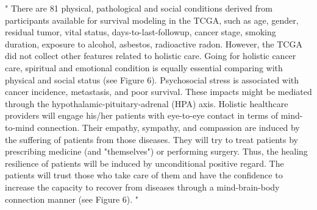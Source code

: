 \documentclass[preprint,12pt]{elsarticle}
\newenvironment{MyIndent}
{\par\leftskip1cm\relax\rightskip1cm\relax}
{\par\leftskip0cm\relax\rightskip0cm\relax}
\newenvironment{MyColorPar}[1]{%
    \leavevmode\color{#1}\ignorespaces%
}{%
}%
\begin{document}
\begin{MyColorPar}{blue}
\begin{MyIndent}
\begin{MyColorPar}{red}
" %
There are 81 physical, pathological and social conditions derived from participants available for survival modeling in the TCGA, %
such as age, gender, residual tumor, vital status, days-to-last-followup, cancer stage, smoking duration, exposure to alcohol, asbestos, radioactive radon. 
However, the TCGA did not collect other features related to holistic care.
Going for holistic cancer care\cite{Mehta2019}\cite{Iftikhar2021}, spiritual and emotional condition is equally essential comparing with physical and social status (see Figure 6).%
Psychosocial stress is associated with cancer incidence\cite{Lutgendorf2010}\cite{Powell2013}\cite{Iftikhar2021}, metastasis\cite{Lutgendorf2010}\cite{Moreno-Smith2010}\cite{Du2020}\cite{Xu2021}, and poor survival\cite{Chida2008}.
These impacts might be mediated through the hypothalamic-pituitary-adrenal (HPA) axis\cite{Hsiao2012}.
Holistic healthcare providers will engage his/her patients with eye-to-eye contact in terms of mind-to-mind connection. Their empathy, sympathy, and compassion are induced by the suffering of patients from those diseases. They will try to treat patients by prescribing medicine (and "themselves") or performing surgery.
Thus, the healing resilience of patients will be induced by unconditional positive regard. %
The patients will trust those who take care of them and have the confidence to increase the capacity to recover from diseases through a mind-brain-body connection manner (see Figure 6).%
"
\end{MyColorPar} %
\end{MyIndent}



\end{MyColorPar}
\end{document}
